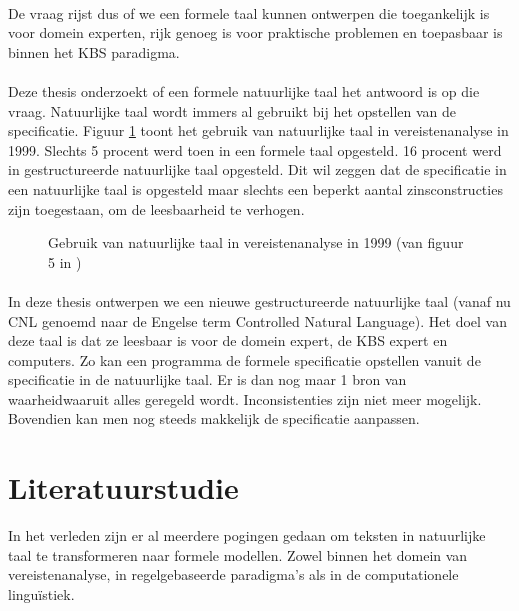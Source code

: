 \documentclass[]{article}
\theoremstyle{definition}
\begin{document}
\paragraph{} De vraag rijst dus of we een formele taal kunnen ontwerpen die toegankelijk is voor domein experten, rijk genoeg is voor praktische problemen en toepasbaar is binnen het KBS paradigma.

\paragraph{} Deze thesis onderzoekt of een formele natuurlijke taal het antwoord is op die vraag. Natuurlijke taal wordt immers al gebruikt bij het opstellen van de specificatie. Figuur \ref{fig:natural-language-use} toont het gebruik van natuurlijke taal in vereistenanalyse in 1999. Slechts 5 procent werd toen in een formele taal opgesteld. 16 procent werd in gestructureerde natuurlijke taal opgesteld. Dit wil zeggen dat de specificatie in een natuurlijke taal is opgesteld maar slechts een beperkt aantal zinsconstructies zijn toegestaan, om de leesbaarheid te verhogen.

\begin{figure}
  \label{fig:natural-language-use}
  \caption{Gebruik van natuurlijke taal in vereistenanalyse in 1999 (van figuur 5 in \cite{Luisa2004})}
\end{figure}

\paragraph{} In deze thesis ontwerpen we een nieuwe gestructureerde natuurlijke taal (vanaf nu CNL genoemd naar de Engelse term Controlled Natural Language). Het doel van deze taal is dat ze leesbaar is voor de domein expert, de KBS expert en computers. Zo kan een programma de formele specificatie opstellen vanuit de specificatie in de natuurlijke taal. Er is dan nog maar 1 bron van waarheidwaaruit alles geregeld wordt. Inconsistenties zijn niet meer mogelijk. Bovendien kan men nog steeds makkelijk de specificatie aanpassen.

\section{Literatuurstudie}
In het verleden zijn er al meerdere pogingen gedaan om teksten in natuurlijke taal te transformeren naar formele modellen. Zowel binnen het domein van vereistenanalyse, in regelgebaseerde paradigma's als in de computationele linguïstiek.
\end{document}
